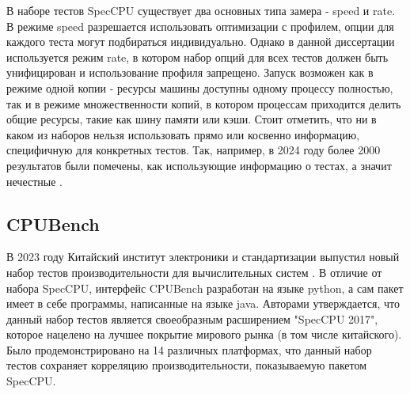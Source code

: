 В наборе тестов SpecCPU существует два основных типа замера - speed и rate. В режиме speed разрешается использовать оптимизации с профилем, опции для каждого теста могут подбираться индивидуально. Однако в данной диссертации используется режим rate, в котором набор опций для всех тестов должен быть унифицирован и использование профиля запрещено. Запуск возможен как в режиме  одной копии - ресурсы машины доступны одному процессу полностью, так и  в режиме множественности копий, в котором процессам приходится делить общие ресурсы, такие как шину памяти или кэши. Стоит отметить, что ни в каком из наборов нельзя использовать прямо или косвенно информацию, специфичную для конкретных тестов. Так, например, в 2024 году более 2000 результатов  были помечены, как использующие информацию о тестах, а значит нечестные \cite{cliffFlagged}.

\subsection{CPUBench}\label{p1:tests:cpubench}

В 2023 году Китайский институт электроники и стандартизации выпустил новый набор тестов производительности для вычислительных систем \cite{lu2023cpubench}. В отличие от набора SpecCPU, интерфейс CPUBench разработан на языке python, а сам пакет имеет в себе программы, написанные на языке java. Авторами утверждается, что данный набор тестов является своеобразным расширением "SpecCPU 2017"\phantom{}, которое нацелено на лучшее покрытие мирового рынка (в том числе китайского). Было продемонстрировано на 14 различных платформах, что данный набор тестов сохраняет корреляцию производительности, показываемую пакетом SpecCPU.

